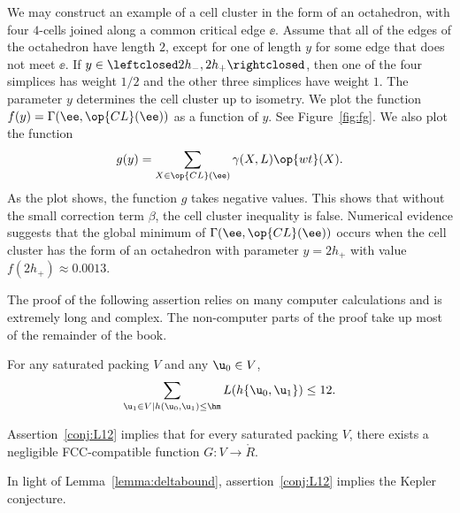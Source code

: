 \begin{example}
  We may construct an example of a cell cluster in the form of an
  octahedron, with four $4$-cells joined along a common critical edge
  $\ee$.  Assume that all of the edges of the octahedron have length
  $2$, except for one of length $y$ for some edge that does not meet
  $\ee$.  If $y\in \leftclosed 2 h_-,2 h_+\rightclosed$, then one of
  the four simplices has weight $1/2$ and the other three simplices
  have weight $1$.  The parameter $y$ determines the cell cluster up
  to isometry.  We plot the function $f(y)=\Gamma(\ee,\op{CL}(\ee))$
  as a function of $y$.  See Figure~\ref{fig:fg}.  We also plot the function
\[
g(y) = \sum_{X\in \op{CL}(\ee)} \gamma(X,L) \op{wt}(X).
\]
As the plot shows, the function $g$ takes negative values.  This shows
that without the small correction term $\beta$, the cell cluster
inequality is false.  Numerical evidence suggests that the global
minimum of $\Gamma(\ee,\op{CL}(\ee))$ occurs when the cell cluster has
the form of an octahedron with parameter $y=2h_+$ with value
$f(2h_+)\approx 0.0013$.
\end{example}

\jxehxqy

The proof of the
following assertion relies on many computer calculations and is
extremely long and complex.  The non-computer parts of the proof take
up most of the remainder of the book.   




\begin{assertion}\label{conj:L12} 
  For any  saturated packing $ V$ and any $ \u_0\in V$,
\begin{equation}\label{eqn:L12} 
\sum_{ \u_1\in V\mid h( \u_0, \u_1)\le \hm} L(h\{\u_0, \u_1\}) \le 12.
\end{equation}
\end{assertion}

\begin{lemma}[]\label{theorem:mk2} 
Assertion~\ref{conj:L12} implies
that for every saturated packing $V$, there exists a negligible FCC-compatible function
$G:V\to \ring{R}$.
\end{lemma}

\begin{remark}\label{rem:L12KC}
In light of Lemma~\ref{lemma:deltabound}, assertion~\ref{conj:L12}
implies the Kepler conjecture. 
\end{remark}

